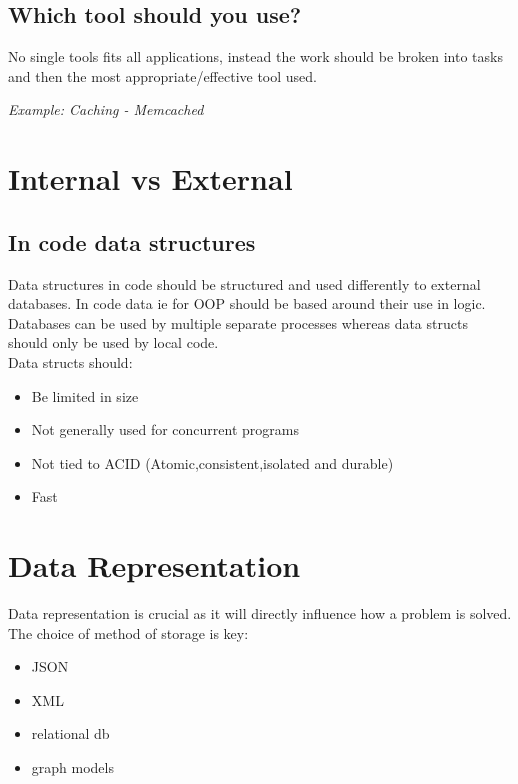 \documentclass[11pt]{scrartcl} %
\begin{document}
\subsection{Which tool should you use?}

No single tools fits all applications, instead the work should be broken into tasks
and then the most appropriate/effective tool used. 

\textit{Example: Caching - Memcached}

\section{Internal vs External}

\subsection{In code data structures}

Data structures in code should be structured and used differently to external databases. In code
data ie for OOP should be based around their use in logic. Databases can be used by multiple separate
processes whereas data structs should only be used by local code.\\

Data structs should:

\begin{itemize}
	\item Be limited in size
	\item Not generally used for concurrent programs
	\item Not tied to ACID (Atomic,consistent,isolated and durable)
	\item Fast
\end{itemize}

\section{Data Representation}

Data representation is crucial as it will directly influence how a problem is solved. The choice of method of storage is
key:

\begin{itemize}
	\item JSON
	\item XML
	\item relational db
	\item graph models
\end{itemize}
\end{document}
